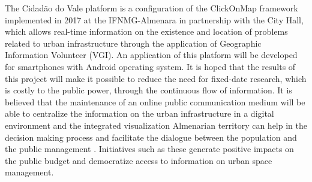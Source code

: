 \documentclass[
12pt,				 %
openright,           %
oneside,			 %
a4paper,			 %
sumario=tradicional, %
chapter=TITLE,		 %
fleqn,				 %
english,
spanish,
brazil,				 %
]{abntex2}%
\begin{document}
\begin{resumo}[abstract]
	The Cidadão do Vale platform is a configuration of the ClickOnMap framework implemented in 2017 at the IFNMG-Almenara in partnership with the City Hall, which allows real-time information on the existence and location of problems related to urban infrastructure through the application of Geographic Information Volunteer (VGI). An application of this platform will be developed for smartphones with Android operating system. It is hoped that the results of this project will make it possible to reduce the need for fixed-date research, which is costly to the public power, through the continuous flow of information. It is believed that the maintenance of an online public communication medium will be able to centralize the information on the urban infrastructure in a digital environment and the integrated visualization Almenarian territory can help in the decision making process and facilitate the dialogue between the population and the public management . Initiatives such as these generate positive impacts on the public budget and democratize access to information on urban space management.
\end{resumo}


\listoffigures*
\clearpage
\cleardoublepage

\begingroup
\let\oldnumberline\numberline
\renewcommand{\numberline}{Algoritmo~\oldnumberline}

\endgroup
\cleardoublepage

\tableofcontents*
\cleardoublepage



\mainmatter
\pagestyle{simple}  %

%
%
%
%


\renewcommand{\bibname}{REFER\^ENCIAS}


\end{document}

